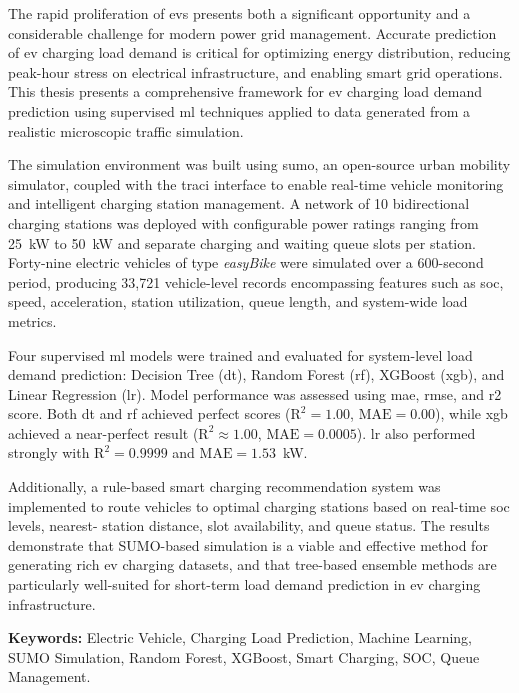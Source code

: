 \documentclass{thesis-library}
\begin{document}
The rapid proliferation of \Gls{ev}s presents both a significant opportunity and a
considerable challenge for modern power grid management. Accurate prediction of
\Gls{ev} charging load demand is critical for optimizing energy distribution, reducing
peak-hour stress on electrical infrastructure, and enabling smart grid operations. This
thesis presents a comprehensive framework for \Gls{ev} charging load demand prediction
using supervised \Gls{ml} techniques applied to data generated from a realistic
microscopic traffic simulation.

The simulation environment was built using \Gls{sumo}, an open-source urban mobility
simulator, coupled with the \Gls{traci} interface to enable real-time vehicle monitoring
and intelligent charging station management. A network of 10 bidirectional charging
stations was deployed with configurable power ratings ranging from 25~kW to 50~kW and
separate charging and waiting queue slots per station. Forty-nine electric vehicles of
type \textit{easyBike} were simulated over a 600-second period, producing 33,721
vehicle-level records encompassing features such as \Gls{soc}, speed, acceleration,
station utilization, queue length, and system-wide load metrics.

Four supervised \Gls{ml} models were trained and evaluated for system-level load demand
prediction: Decision Tree (\Gls{dt}), Random Forest (\Gls{rf}), XGBoost (\Gls{xgb}),
and Linear Regression (\Gls{lr}). Model performance was assessed using \Gls{mae},
\Gls{rmse}, and \Gls{r2} score. Both \Gls{dt} and \Gls{rf} achieved perfect scores
($\text{R}^2 = 1.00$, $\text{MAE} = 0.00$), while \Gls{xgb} achieved a near-perfect
result ($\text{R}^2 \approx 1.00$, $\text{MAE} = 0.0005$). \Gls{lr} also performed
strongly with $\text{R}^2 = 0.9999$ and $\text{MAE} = 1.53$~kW.

Additionally, a rule-based smart charging recommendation system was implemented to route
vehicles to optimal charging stations based on real-time \Gls{soc} levels, nearest-
station distance, slot availability, and queue status. The results demonstrate that
SUMO-based simulation is a viable and effective method for generating rich \Gls{ev}
charging datasets, and that tree-based ensemble methods are particularly well-suited for
short-term load demand prediction in \Gls{ev} charging infrastructure.

\vspace{0.5cm}
\noindent\textbf{Keywords:} Electric Vehicle, Charging Load Prediction, Machine Learning,
SUMO Simulation, Random Forest, XGBoost, Smart Charging, SOC, Queue Management.
\end{document}
